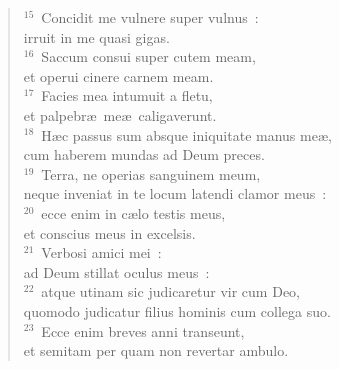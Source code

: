 \begin{flushleft}
\begin{verse}
${}^{15}$~Concidit me vulnere super vulnus~:\\ irruit in me quasi gigas.\\
${}^{16}$~Saccum consui super cutem meam,\\ et operui cinere carnem meam.\\
${}^{17}$~Facies mea intumuit a fletu,\\ et palpebr\ae\ me\ae\ caligaverunt.\\
${}^{18}$~H\ae c passus sum absque iniquitate manus me\ae ,\\ cum haberem mundas ad Deum preces.\\
${}^{19}$~Terra, ne operias sanguinem meum,\\ neque inveniat in te locum latendi clamor meus~:\\
${}^{20}$~ecce enim in c\ae lo testis meus,\\ et conscius meus in excelsis.\\
${}^{21}$~Verbosi amici mei~:\\ ad Deum stillat oculus meus~:\\
${}^{22}$~atque utinam sic judicaretur vir cum Deo,\\ quomodo judicatur filius hominis cum collega suo.\\
${}^{23}$~Ecce enim breves anni transeunt,\\ et semitam per quam non revertar ambulo.\end{verse}\end{flushleft}


